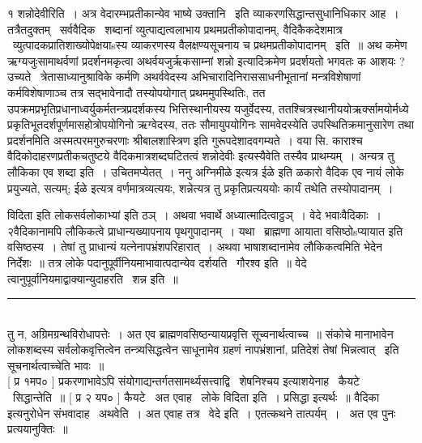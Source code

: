 \documentclass[11pt, openany]{book}
\begin{document}
\begin{multicols}{2}
१ शन्नोदेवीरिति~। अत्र वेदारम्भप्रतीकान्येव भाष्ये उक्तानि \textendash\ इति व्याकरणसिद्धान्तसुधानिधिकार आह~। तत्रैतदुक्तम् \textendash\ सर्ववैदिक \textendash\ शब्दानां व्युत्पाद्यत्वलाभाय प्रथमप्रतीकोपादानम्, वैदिकैकदेशमात्र \textendash\ व्युत्पादकप्रातिशाख्योपेक्षयाsस्य व्याकरणस्य वैलक्षण्यसूचनाय च प्रथमप्रतीकोपादानम् \textendash\ इति~॥ अथ कमेण ऋग्यजुःसामाथर्वणां प्रदर्शनमकृत्वा अथर्वयजुर्ऋकसाम्नां {\qt शन्नो} इत्यादिक्रमेण प्रदर्शयतो भगवतः क आशयः ? उच्यते \textendash\ त्रेतासाध्यानुश्राविके कर्मणि अथर्ववेदस्य अभिचारादिनिराससाधनीभूतानां मन्त्रविशेषाणां कर्मविशेषाणाञ्च तत्र सद्भावेनादौ तस्योपयोगात् प्रथममुपस्थितिः, तत उपक्रमप्रभृतिप्रधानाध्वर्युकर्मतन्त्रप्रदर्शकस्य भित्तिस्थानीयस्य यजुर्वेदस्य, ततश्चित्रस्थानीययोऋर्क्सामयोर्मध्ये प्रकृतिभूतदर्शपूर्णमासहोत्रोपयोगिनो ऋग्वेदस्य, ततः सौमायुपयोगिनः सामवेदस्येति उपस्थितिक्रमानुसारेण तथा प्रदर्शनमिति अस्मत्परमगुरुचरणाः श्रीबालशास्त्रिण इति गुरूपदेशादवगम्यते~। वया सि. काराश्च वैदिकोदाहरणप्रतीकचतुष्टये वैदिकमात्रशब्दघटितत्वं {\qt शन्नोदेवीः} इत्यस्यैवेति तस्यैव प्राथम्यम्~। अन्यत्र तु लौकिका एव शब्दा इति~। उचितमप्येतत्~। ननु {\qt अग्निमीळे इत्यत्र ईळे} इति ळकारो वैदिक एव नायं लोके प्रयुज्यते, सत्यम्; ईळे इत्यत्र वर्णमात्रव्यत्ययः, शन्नेत्यत्र तु प्रकृतिप्रत्यययोः कार्यं तथेति तस्योपादानम्~।

\columnbreak

\noindent
विदिता इति {\qt लोकसर्वलोकाभ्यां }इति ठञ्~। अथवा भवार्थे अध्यात्मादित्वाट्ठञ्~। वेदे भवाःवैदिकाः~। २वैदिकानामपि लौकिकत्वे प्राधान्यख्यापनाय पृथगुपादानम्~। यथा \textendash\ ब्राह्मणा आयाता वसिष्ठोsप्यायात इति वसिष्ठस्य~। तेषां तु प्राधान्यं यत्नेनापभ्रंशपरिहारात्~। अथवा भाषाशब्दानामेव लौकिकत्वमिति भेदेन निर्देशः~॥ तत्र लोके पदानुपूर्वीनियमाभावात्पदान्येव दर्शयति \textendash\ गौरश्व इति~॥ वेदे त्वानुपूर्वानियमाद्वाक्यान्युदाहरति \textendash\ शन्न इति~॥

\noindent
\rule{1\linewidth}{0.5pt}\\

\noindent
तु न, अग्रिमग्रन्थविरोधापत्तेः~। अत एव ब्राह्मणवसिष्ठन्यायप्रवृत्ति सूच्वनार्थत्वाच्च~॥ संकोचे मानाभावेन लोकशब्दस्य सर्वलोकवृत्तित्वेन तन्त्र्यसिद्धत्वेन साधूनामेव ग्रहणं नापभ्रंशानां, प्रतिदेशं तेषां भिन्नत्वात् \textendash\ इति सूचनार्थत्वाच्चेति भावः~॥\\

 [ प्र १मप० ] प्रकरणाभावेऽपि संयोगाद्यन्तर्गतसामर्थ्यसत्त्वाद्वि \textendash\ शेषनिश्चय इत्याशयेनाह \textendash\ कैयटे \textendash\ सिद्धान्तेति~॥ [ प्र २ यप० ] कैयटे \textendash\ अत एवाह \textendash\ लोके विदिता इति~। प्रसिद्धा इत्यर्थः~॥ वैदिका इत्यनुरोधेन संभवादाह \textendash\ अथवेति~। अत एवाह तत्र \textendash\ वेदे इति~। एतत्कथने तात्पर्यम्~। \textendash\ अत एव पुनः प्रत्ययानुक्तिः~॥\\


\end{multicols}
\end{document}
